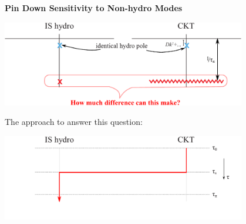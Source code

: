 \documentclass[9pt,a4paper,unknownkeysallowed,xcolor=dvipsnames,aspectratio=43]{beamer}
\begin{document}
\begin{frame}{\bf\huge Pin Down Sensitivity to Non-hydro Modes}
\begin{center}
\includegraphics[width=0.8\textwidth]{fig/omega_ISCKT}\end{center}
\vspace{4mm}
The approach to answer this question:
\vspace{4mm}
\begin{center}
\includegraphics[width=0.8\textwidth]{fig/approachnonhydros}\end{center}
\end{frame}
%
\end{document}
